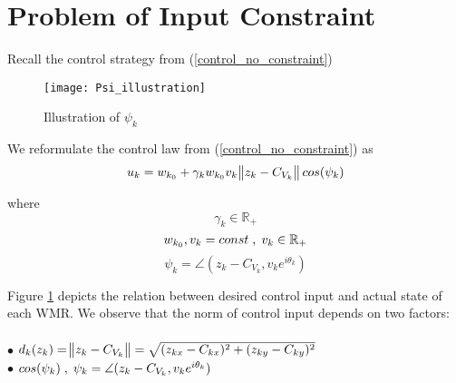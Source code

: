 \section{Problem of Input Constraint}
Recall the control strategy from (\ref{control_no_constraint})
\begin{figure}[h]
	\centering
	\texttt{[image: Psi\_illustration]}
	\caption{Illustration of ${\psi_{k}}$}
	\label{fig:control_input_constraint}
\end{figure}

\noindent We reformulate the control law from (\ref{control_no_constraint}) as
\[u_{k} = w_{k_0} + \gamma_{k} w_{k_0} v_{k}\norm{z_{k} - C_{V_{k}}}cos(\psi_{k})\]

\noindent where
\[\gamma_{k} \in \mathbb{R}_+\]
\[w_{k_0}, v_{k} = const \txtspc{,} v_k \in \mathbb{R}_+\]
\[\psi_{k} = \angle (z_{k} - C_{V_{k}}, v_{k}e^{i\theta_{k}})\]  

\noindent Figure \ref{fig:control_input_constraint} depicts the relation between desired control input and actual state of each WMR. We observe that the norm of control input depends on two factors: \\ \\
\indent $\bullet$ ${d_{k}(z_{k}) = \norm{z_{k} - C_{V_{k}}} = \sqrt{(z_{kx} - C_{kx})^{2} + (z_{ky} - C_{ky})^{2}}}$ \\
\indent $\bullet$ ${cos(\psi_{k}) \txtspc{,} \psi_{k} = \angle ({z_{k} - C_{V_{k}}},{v_{k}}e^{i\theta_{k}})}$  \\


